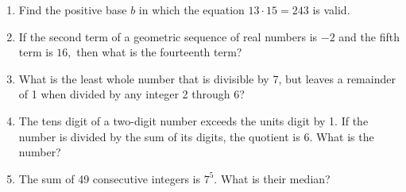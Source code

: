 \documentclass{article}
\begin{document}
\begin{enumerate}
    \item Find the positive base $b$ in which the equation $13\cdot15=243$ is valid. 
    \item If the second term of a geometric sequence of real numbers is $-2$ and the fifth term is $16,$ then what is the fourteenth term?
    \item What is the least whole number that is divisible by 7, but leaves a remainder of 1 when divided by any integer 2 through 6? 
    \item The tens digit of a two-digit number exceeds the units digit by 1. If the number is divided by the sum of its digits, the quotient is 6. What is the number?
    \item The sum of 49 consecutive integers is $7^5$. What is their median?
   
\end{enumerate}
\end{document}
